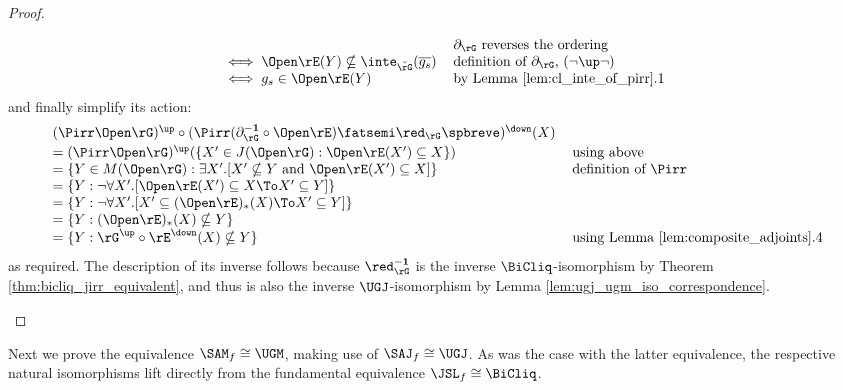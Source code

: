 \documentclass{article}
\begin{document}
\begin{proof}
\begin{enumerate}
\[\begin{tabular}{lll}
&  $\partial_\rG$ reverses the ordering
\\ \quad
$\iff \Open\rE(Y) \nsubseteq \inte_{\breve{\rG}}(\overline{g_s})$
& definition of $\partial_\rG$, $(\neg\up\neg)$
\\ \quad
$\iff g_s \in \Open\rE(Y)$
& by Lemma \ref{lem:cl_inte_of_pirr}.1
\end{tabular}
\]
and finally simplify its action:
\[
\begin{tabular}{lll}
$(\Pirr\Open\rG)^\up \circ (\Pirr(\partial_\rG^{\bf-1} \circ \Open\rE) \fatsemi \red_\rG\spbreve)^\down(X)$
\\[0.5ex]
$= (\Pirr\Open\rG)^\up(\{ X' \in J(\Open\rG) : \Open\rE(X') \subseteq X  \})$
& using above
\\
$= \{ Y \in M(\Open\rG) : \exists X'.[ X' \nsubseteq Y \text{ and } \Open\rE(X') \subseteq X ] \}$
& definition of $\Pirr$
\\
$= \{ Y  : \neg\forall X'.[ \Open\rE(X') \subseteq X \To X' \subseteq Y ] \}$
\\
$= \{ Y  : \neg\forall X'.[ X' \subseteq (\Open\rE)_*(X) \To X' \subseteq Y ] \}$
\\
$= \{ Y  : (\Open\rE)_*(X) \nsubseteq Y \}$
\\
$= \{ Y : \rG^\up \circ \rE^\down(X) \nsubseteq Y \}$
& using Lemma \ref{lem:composite_adjoints}.4
\end{tabular}
\]
as required. The description of its inverse follows because $\red_\rG^{\bf-1}$ is the inverse $\BiCliq$-isomorphism by Theorem \ref{thm:bicliq_jirr_equivalent}, and thus is also the inverse $\UGJ$-isomorphism by Lemma \ref{lem:ugj_ugm_iso_correspondence}.

\end{enumerate}
\end{proof}

\smallskip


Next we prove the equivalence $\SAM_f \cong \UGM$, making use of $\SAJ_f \cong \UGJ$. As was the case with the latter equivalence, the respective natural isomorphisms lift directly from the fundamental equivalence $\JSL_f \cong \BiCliq$.

\smallskip
\end{document}
